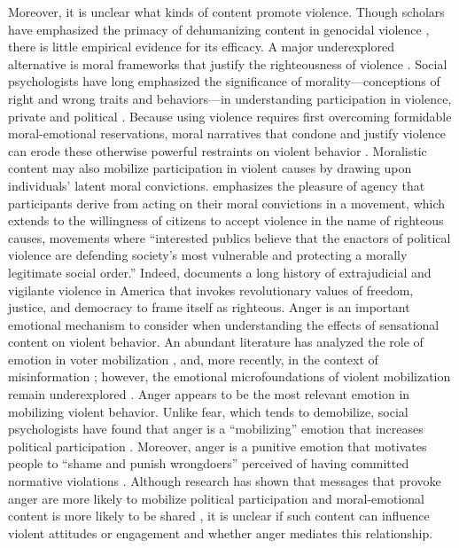 Moreover, it is unclear what kinds of content promote violence. Though scholars have emphasized the primacy of dehumanizing content in genocidal violence \citep{fein1979accounting, charny1982can}, there is little empirical evidence for its efficacy. A major underexplored alternative is moral frameworks that justify the righteousness of violence \citep{viterna2014radical}. Social psychologists have long emphasized the significance of morality---conceptions of right and wrong traits and behaviors---in understanding participation in violence, private and political \citep{bandura1975disinhibition,baumeister1999evil,beck1999prisoners,fiske2014virtuous}. Because using violence requires first overcoming formidable moral-emotional reservations, moral narratives that condone and justify violence can erode these otherwise powerful restraints on violent behavior \citep{baumeister1999evil,beck1999prisoners,fincher2016perceptual}. Moralistic content may also mobilize participation in violent causes by drawing upon individuals' latent moral convictions. \cite{wood2003insurgent} emphasizes the pleasure of agency that participants derive from acting on their moral convictions in a movement, which \cite{viterna2014radical} extends to the willingness of citizens to accept violence in the name of righteous causes, movements where ``interested publics believe that the enactors of political violence are defending society's most vulnerable and protecting a morally legitimate social order.'' Indeed, \cite{kirkpatrick2008uncivil} documents a long history of extrajudicial and vigilante violence in America that invokes revolutionary values of freedom, justice, and democracy to frame itself as righteous.
Anger is an important emotional mechanism to consider when understanding the effects of sensational content on violent behavior. An abundant literature has analyzed the role of emotion in voter mobilization \citep{ansolabehere1997going,banks2014anger,brader2005striking,brader2006campaigning,freedman1999measuring,huber2015seeingred,marcus2000affective,mendelberg2001race}, and, more recently, in the context of misinformation \citep{vosoughi2018spread}; however, the emotional microfoundations of violent mobilization remain underexplored \citep{viterna2013women}. Anger appears to be the most relevant emotion in mobilizing violent behavior. Unlike fear, which tends to demobilize, social psychologists have found that anger is a ``mobilizing'' emotion that increases political participation \citep{ansolabehere1997going, banks2014anger, lerner2001fear,ryan2012click, valentino2002cues, valentino2011election}. Moreover, anger is a punitive emotion that motivates people to ``shame and punish wrongdoers'' perceived of having committed normative violations \citep{crockett2017moral, goldberg1999rage}. Although research has shown that messages that provoke anger are more likely to mobilize political participation \citep{ryan2012click,valentino2002cues, valentino2011election} and moral-emotional content is more likely to be shared \citep{brady2017emotion}, it is unclear if such content can influence violent attitudes or engagement and whether anger mediates this relationship. 


